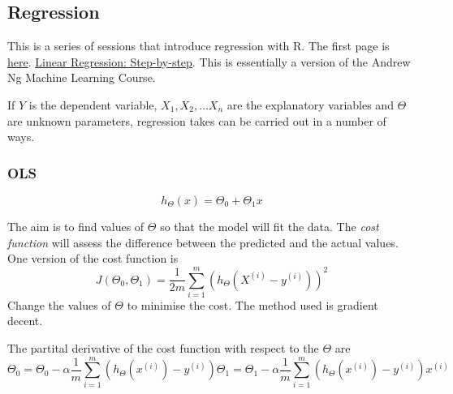 \documentclass[12pt, a4paper, oneside]{article} %
\begin{document}
\subsection{Regression}
This is a series of sessions that introduce regression with R.  The first page is \href{http://pingax.com/2013/11/}{here}.  \href{http://pingax.com/linear-regression-with-r-step-by-step-implementation-part-1/}{Linear Regression: Step-by-step}. This is essentially a version of the Andrew Ng Machine Learning Course.  

If $Y$ is the dependent variable, $X_1, X_2, \dots X_n$ are the explanatory variables and $\Theta$ are unknown parameters, regression takes can be carried out in a number of ways. 

\subsubsection{OLS}
\begin{equation}
h_{\Theta}(x) = \Theta_0 + \Theta_1 x
\end{equation}

The aim is to find values of $\Theta$ so that the model will fit the data.  The \emph{cost function} will assess the difference between the predicted and the actual values. One version of the cost function is 
\begin{equation}
J(\Theta_0, \Theta_1) = \frac{1}{2m} \sum_{i=1}^m (h_{\Theta}(X^{(i)} - y^{(i)}))^2
\end{equation}
Change the values of $\Theta$ to minimise the cost. The method used is gradient decent. 

The partital derivative of the cost function with respect to the $\Theta$ are
\begin{subequations}
\begin{equation}
\Theta_0 = \Theta_0 - \alpha \frac{1}{m}\sum_{i=1}^m (h_{\Theta}(x^{(i)}) - y^{(i)})
\end{equation}
\begin{equation}
\Theta_1 = \Theta_1 - \alpha \frac{1}{m}\sum_{i=1}^m (h_{\Theta}(x^{(i)}) - y^{(i)})x^{(i)}
\end{equation}
\end{subequations}
\end{document}
